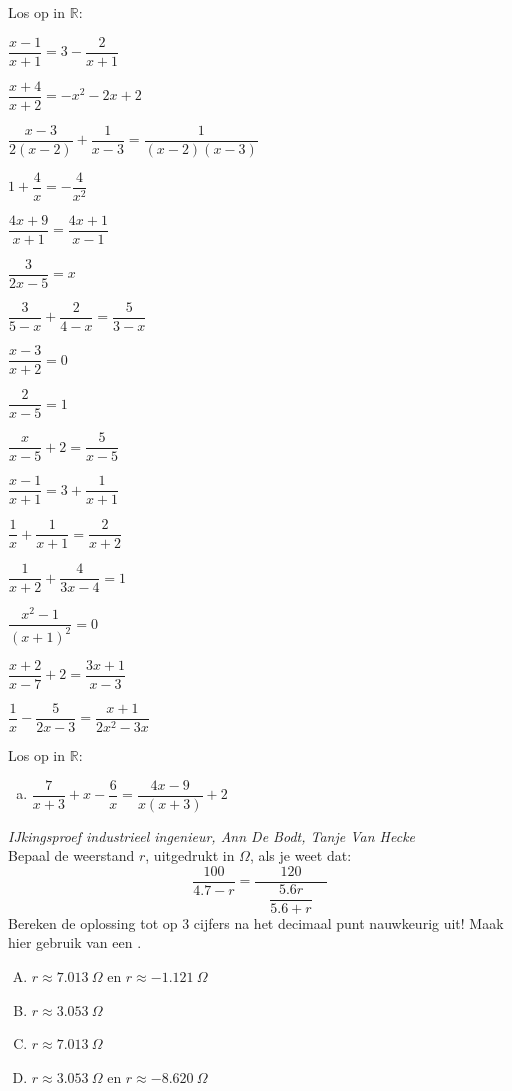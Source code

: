 \documentclass[12pt,twoside,a4paper]{article}
\begin{document}
\begin{oefening} %
Los op in $\mathbb{R}$:
\begin{exlist}{2}
  \item $\dfrac{x-1}{x+1}=3-\dfrac{2}{x+1}$
  \item $\dfrac{x+4}{x+2}=-x^2-2x+2$
  \item $\dfrac{x-3}{2(x-2)}+\dfrac{1}{x-3}=\dfrac{1}{(x-2)(x-3)}$
  \item $1+\dfrac{4}{x}=-\dfrac{4}{x^2}$
  \item $\dfrac{4x+9}{x+1}=\dfrac{4x+1}{x-1}$
  \item $\dfrac{3}{2x-5}=x$
  \item $\dfrac{3}{5-x}+\dfrac{2}{4-x}=\dfrac{5}{3-x}$
  \item $\dfrac{x-3}{x+2}=0$
  \item $\dfrac{2}{x-5}=1$
  \item $\dfrac{x}{x-5}+2=\dfrac{5}{x-5}$
  \item $\dfrac{x-1}{x+1}=3+\dfrac{1}{x+1}$
  \item $\dfrac{1}{x}+\dfrac{1}{x+1}=\dfrac{2}{x+2}$
  \item $\dfrac{1}{x+2}+\dfrac{4}{3x-4}=1$
  \item $\dfrac{x^2-1}{(x+1)^2}=0$
  \item $\dfrac{x+2}{x-7}+2=\dfrac{3x+1}{x-3}$
  \item $\dfrac{1}{x}-\dfrac{5}{2x-3}=\dfrac{x+1}{2x^2-3x}$
\end{exlist}
\end{oefening}

\begin{oefening} %
Los op in $\mathbb{R}$:\\
\begin{enumerate}[(a)]
  \itemsep.4em
  \item $\dfrac{7}{x+3} + x - \dfrac{6}{x} = \dfrac{4x-9}{x(x+3)} + 2$
\end{enumerate}
\end{oefening}

\begin{oefening}{\scriptsize\em IJkingsproef industrieel ingenieur, Ann De Bodt, Tanje Van Hecke}\\
Bepaal de weerstand $r$, uitgedrukt in $\Omega$, als je weet dat:
$$\dfrac{100}{4.7-r}=\dfrac{120}{\quad\dfrac{5.6r}{5.6+r}\quad}$$
Bereken de oplossing tot op 3 cijfers na het decimaal punt nauwkeurig uit!
Maak hier gebruik van een .
\begin{enumerate}[(A)]
  \itemsep.5em
  \item $r \approx 7.013\ \Omega$ en $r \approx -1.121\ \Omega$
  \item $r \approx 3.053\ \Omega$
  \item $r \approx 7.013\ \Omega$
  \item $r \approx 3.053\ \Omega$ en $r \approx -8.620\ \Omega$
\end{enumerate}
\end{oefening}
\end{document}
